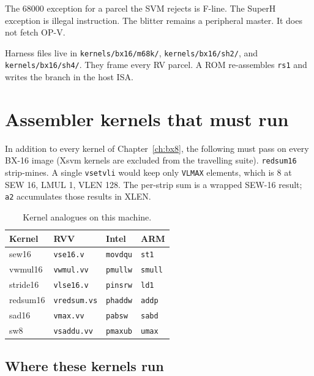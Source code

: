 The 68000 exception for a parcel the SVM rejects is F-line. The SuperH exception is illegal instruction. The blitter remains a peripheral master. It does not fetch OP-V.

Harness files live in \texttt{kernels/bx16/m68k/}, \texttt{kernels/bx16/sh2/}, and \texttt{kernels/bx16/sh4/}. They frame every RV parcel. A ROM re-assembles \texttt{rs1} and writes the branch in the host ISA.

\section{Assembler kernels that must run}

In addition to every kernel of Chapter~\ref{ch:bx8}, the following must pass on every BX-16 image (Xsvm kernels are excluded from the travelling suite). \texttt{redsum16} strip-mines. A single \texttt{vsetvli} would keep only \texttt{VLMAX} elements, which is 8 at SEW 16, LMUL 1, VLEN 128. The per-strip sum is a wrapped SEW-16 result; \texttt{a2} accumulates those results in XLEN.

\begin{table}[htbp]
\centering
\caption{Kernel analogues on this machine.}
\small
\begin{tabular}{@{}llll@{}}
\toprule
Kernel & RVV & Intel & ARM \\
\midrule
sew16 & \texttt{vse16.v} & \texttt{movdqu} & \texttt{st1} \\
vwmul16 & \texttt{vwmul.vv} & \texttt{pmullw} & \texttt{smull} \\
stride16 & \texttt{vlse16.v} & \texttt{pinsrw} & \texttt{ld1} \\
redsum16 & \texttt{vredsum.vs} & \texttt{phaddw} & \texttt{addp} \\
sad16 & \texttt{vmax.vv} & \texttt{pabsw} & \texttt{sabd} \\
sw8 & \texttt{vsaddu.vv} & \texttt{pmaxub} & \texttt{umax} \\
\bottomrule
\end{tabular}
\end{table}

\subsection{Where these kernels run}

